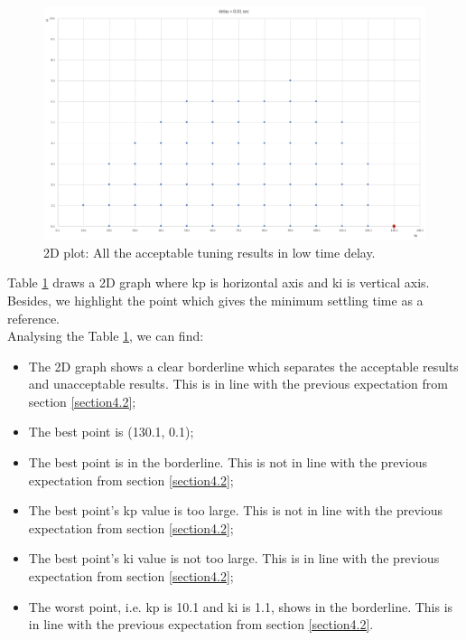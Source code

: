 \documentclass{report}
\begin{document}
\begin{figure}[htbp]
\centering
\includegraphics[width = .819\textwidth]{figure/4_4_1_2d.png}
\caption{2D plot: All the acceptable tuning results in low time delay.}
\label{4_4_1_2d}
\end{figure}

Table \textcolor{red}{\ref{4_4_1_2d}} draws a 2D graph where kp is horizontal axis and ki is vertical axis. Besides, we highlight the point which gives the minimum settling time as a reference.\\

Analysing the Table \textcolor{red}{\ref{4_4_1_2d}}, we can find:\\

\begin{itemize}
\item The 2D graph shows a clear borderline which separates the acceptable results and unacceptable results. This is in line with the previous expectation from section \textcolor{red}{\ref{section4.2}};\\

\item The best point is (130.1, 0.1);\\

\item The best point is in the borderline.  This is not in line with the previous expectation from section \textcolor{red}{\ref{section4.2}};\\

\item The best point’s kp value is too large. This is not in line with the previous expectation from section \textcolor{red}{\ref{section4.2}};\\

\item The best point’s ki value is not too large.  This is in line with the previous expectation from section \textcolor{red}{\ref{section4.2}};\\

\item The worst point, i.e. kp is 10.1 and ki is 1.1, shows in the borderline. This is in line with the previous expectation from section \textcolor{red}{\ref{section4.2}}.\\
\end{itemize}
\end{document}
